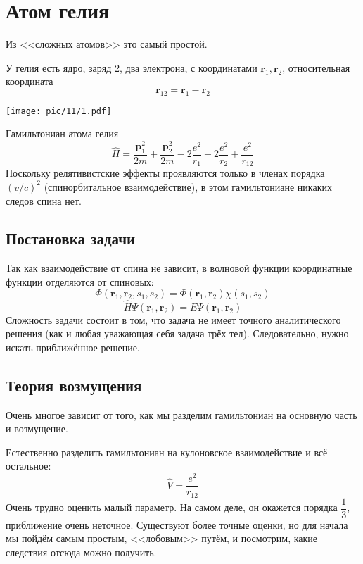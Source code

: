 \section{Атом гелия}
\def \bf {\boldsymbol}
Из <<сложных атомов>> это самый простой.

У гелия есть ядро, заряд 2, два электрона, с координатами $\bf r_1, \bf r_2$, относительная координата
$$
    \bf r_{12} = \bf r_1 - \bf r_2
$$
\centerline{\texttt{[image: pic/11/1.pdf]}}
Гамильтониан атома гелия
$$
    \hat H = \dfrac{\bf p_1^2}{2m} + \dfrac{\bf p_2^2}{2m} - 2\dfrac{e^2}{r_1} - 2\dfrac{e^2}{r_2} + \dfrac{e^2}{r_{12}}
$$
Поскольку релятивистские эффекты проявляются только в членах порядка $(v/c)^2$ (спинорбитальное взаимодействие), в этом гамильтониане никаких следов спина нет. 

\subsection{Постановка задачи}
Так как взаимодействие от спина не зависит, в волновой функции координатные функции отделяются от спиновых:
$$
    \Phi(\bf r_1, \bf r_2, s_1, s_2) = \Phi(\bf r_1, \bf r_2) \chi(s_1, s_2)
$$
$$
    \hat H \Psi(\bf r_1, \bf r_2) = E \Psi(\bf r_1, \bf r_2)
$$
Сложность задачи состоит в том, что задача не имеет точного аналитического решения (как и любая уважающая себя задача трёх тел). Следовательно, нужно искать приближённое решение.

\subsection{Теория возмущения}
Очень многое зависит от того, как мы разделим гамильтониан на основную часть и возмущение.

Естественно разделить гамильтониан на кулоновское взаимодействие и всё остальное:
$$
    \hat V = \dfrac{e^2}{r_{12}}
$$
Очень трудно оценить малый параметр. На самом деле, он окажется порядка $\dfrac{1}{3}$, приближение очень неточное. Существуют более точные оценки, но для начала мы пойдём самым простым, <<лобовым>> путём, и посмотрим, какие следствия отсюда можно получить.

